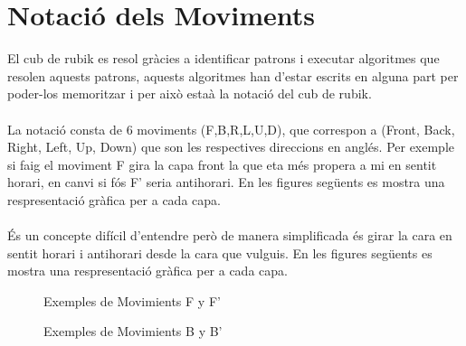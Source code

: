 \section{Notació dels Moviments}

El cub de rubik es resol gràcies a identificar patrons i executar algoritmes que resolen aquests patrons, aquests algoritmes han d'estar escrits en alguna part per poder-los memoritzar i per això estaà la notació del cub de rubik.
\\\\La notació consta de 6 moviments (F,B,R,L,U,D), que correspon a (Front, Back, Right, Left, Up, Down) que son les respectives direccions en anglés. Per exemple si faig el moviment F gira la capa front la que eta més propera a mi en sentit horari, en canvi si fós F' seria antihorari. En les figures següents es mostra una respresentació gràfica per a cada capa.
\\\\És un concepte difícil d'entendre però de manera simplificada és girar la cara en sentit horari i antihorari desde la cara que vulguis. En les figures següents es mostra una respresentació gràfica per a cada capa.

\begin{figure}[htbp]
    \centering
    \begin{subfigure}
        \centering\RubikCubeSolvedWY
    \end{subfigure}
    \begin{subfigure}
        \centering\RubikCubeSolvedWY
    \end{subfigure}
    \caption{Exemples de Movimients F y F'}
\end{figure}

\begin{figure}[htbp]
    \centering
    \begin{subfigure}
        \centering\RubikCubeSolvedWY
    \end{subfigure}
    \begin{subfigure}
        \centering\RubikCubeSolvedWY
    \end{subfigure}
    \caption{Exemples de Movimients B y B'}
\end{figure}

